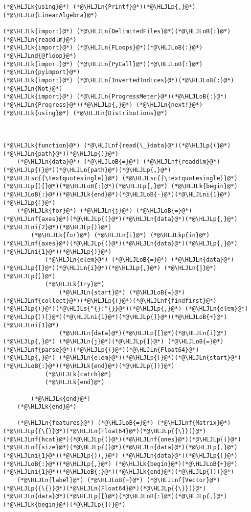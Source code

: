 \documentclass[12pt,a4paper]{article}
\newcommand{\HLJLk}[1]{\textcolor[RGB]{148,91,176}{\textbf{#1}}}
\newcommand{\HLJLkp}[1]{\textcolor[RGB]{148,91,176}{\textbf{#1}}}
\newcommand{\HLJLn}[1]{#1}
\newcommand{\HLJLnd}[1]{\textcolor[RGB]{214,102,97}{#1}}
\newcommand{\HLJLnf}[1]{\textcolor[RGB]{66,102,213}{#1}}
\newcommand{\HLJLs}[1]{\textcolor[RGB]{201,61,57}{#1}}
\newcommand{\HLJLsc}[1]{\textcolor[RGB]{201,61,57}{#1}}
\newcommand{\HLJLni}[1]{\textcolor[RGB]{59,151,46}{#1}}
\newcommand{\HLJLoB}[1]{\textcolor[RGB]{102,102,102}{\textbf{#1}}}
\newcommand{\HLJLp}[1]{#1}
\begin{document}
\begin{lstlisting}
(*@\HLJLk{using}@*) (*@\HLJLn{Printf}@*)(*@\HLJLp{,}@*) (*@\HLJLn{LinearAlgebra}@*)

(*@\HLJLk{import}@*) (*@\HLJLn{DelimitedFiles}@*)(*@\HLJLoB{:}@*) (*@\HLJLn{readdlm}@*)
(*@\HLJLk{import}@*) (*@\HLJLn{FLoops}@*)(*@\HLJLoB{:}@*) (*@\HLJLnd{@floop}@*)
(*@\HLJLk{import}@*) (*@\HLJLn{PyCall}@*)(*@\HLJLoB{:}@*) (*@\HLJLn{pyimport}@*)
(*@\HLJLk{import}@*) (*@\HLJLn{InvertedIndices}@*)(*@\HLJLoB{:}@*) (*@\HLJLn{Not}@*)
(*@\HLJLk{import}@*) (*@\HLJLn{ProgressMeter}@*)(*@\HLJLoB{:}@*) (*@\HLJLn{Progress}@*)(*@\HLJLp{,}@*) (*@\HLJLn{next!}@*)
(*@\HLJLk{using}@*) (*@\HLJLn{Distributions}@*)



(*@\HLJLk{function}@*) (*@\HLJLnf{read{\_}data}@*)(*@\HLJLp{(}@*)(*@\HLJLn{path}@*)(*@\HLJLp{)}@*)
    (*@\HLJLn{data}@*) (*@\HLJLoB{=}@*) (*@\HLJLnf{readdlm}@*)(*@\HLJLp{(}@*)(*@\HLJLn{path}@*)(*@\HLJLp{,}@*) (*@\HLJLsc{{\textquotesingle}}@*) (*@\HLJLsc{{\textquotesingle}}@*)(*@\HLJLp{)[}@*)(*@\HLJLoB{:}@*)(*@\HLJLp{,}@*) (*@\HLJLk{begin}@*)(*@\HLJLoB{:}@*)(*@\HLJLk{end}@*)(*@\HLJLoB{-}@*)(*@\HLJLni{1}@*)(*@\HLJLp{]}@*)
    (*@\HLJLk{for}@*) (*@\HLJLn{j}@*) (*@\HLJLoB{=}@*) (*@\HLJLnf{axes}@*)(*@\HLJLp{(}@*)(*@\HLJLn{data}@*)(*@\HLJLp{,}@*) (*@\HLJLni{2}@*)(*@\HLJLp{)}@*)
        (*@\HLJLk{for}@*) (*@\HLJLn{i}@*) (*@\HLJLkp{in}@*) (*@\HLJLnf{axes}@*)(*@\HLJLp{(}@*)(*@\HLJLn{data}@*)(*@\HLJLp{,}@*) (*@\HLJLni{1}@*)(*@\HLJLp{)}@*)
            (*@\HLJLn{elem}@*) (*@\HLJLoB{=}@*) (*@\HLJLn{data}@*)(*@\HLJLp{[}@*)(*@\HLJLn{i}@*)(*@\HLJLp{,}@*) (*@\HLJLn{j}@*)(*@\HLJLp{]}@*)
            (*@\HLJLk{try}@*)
                (*@\HLJLn{start}@*) (*@\HLJLoB{=}@*) (*@\HLJLnf{collect}@*)(*@\HLJLp{(}@*)(*@\HLJLnf{findfirst}@*)(*@\HLJLp{(}@*)(*@\HLJLs{"{}:"{}}@*)(*@\HLJLp{,}@*) (*@\HLJLn{elem}@*)(*@\HLJLp{))[}@*)(*@\HLJLni{1}@*)(*@\HLJLp{]}@*)(*@\HLJLoB{+}@*)(*@\HLJLni{1}@*)
                (*@\HLJLn{data}@*)(*@\HLJLp{[}@*)(*@\HLJLn{i}@*)(*@\HLJLp{,}@*) (*@\HLJLn{j}@*)(*@\HLJLp{]}@*) (*@\HLJLoB{=}@*) (*@\HLJLnf{parse}@*)(*@\HLJLp{(}@*)(*@\HLJLn{Float64}@*)(*@\HLJLp{,}@*) (*@\HLJLn{elem}@*)(*@\HLJLp{[}@*)(*@\HLJLn{start}@*)(*@\HLJLoB{:}@*)(*@\HLJLk{end}@*)(*@\HLJLp{])}@*)
            (*@\HLJLk{catch}@*)
            (*@\HLJLk{end}@*)
            
        (*@\HLJLk{end}@*)
    (*@\HLJLk{end}@*)

    (*@\HLJLn{features}@*) (*@\HLJLoB{=}@*) (*@\HLJLnf{Matrix}@*)(*@\HLJLp{{\{}}@*)(*@\HLJLn{Float64}@*)(*@\HLJLp{{\}}(}@*)(*@\HLJLnf{hcat}@*)(*@\HLJLp{(}@*)(*@\HLJLnf{ones}@*)(*@\HLJLp{(}@*)(*@\HLJLnf{size}@*)(*@\HLJLp{(}@*)(*@\HLJLn{data}@*)(*@\HLJLp{,}@*) (*@\HLJLni{1}@*)(*@\HLJLp{)),}@*) (*@\HLJLn{data}@*)(*@\HLJLp{[}@*)(*@\HLJLoB{:}@*)(*@\HLJLp{,}@*) (*@\HLJLk{begin}@*)(*@\HLJLoB{+}@*)(*@\HLJLni{1}@*)(*@\HLJLoB{:}@*)(*@\HLJLk{end}@*)(*@\HLJLp{]))}@*)
    (*@\HLJLn{label}@*) (*@\HLJLoB{=}@*) (*@\HLJLnf{Vector}@*)(*@\HLJLp{{\{}}@*)(*@\HLJLn{Float64}@*)(*@\HLJLp{{\}}(}@*)(*@\HLJLn{data}@*)(*@\HLJLp{[}@*)(*@\HLJLoB{:}@*)(*@\HLJLp{,}@*) (*@\HLJLk{begin}@*)(*@\HLJLp{])}@*)
    

\end{lstlisting}
\end{document}

